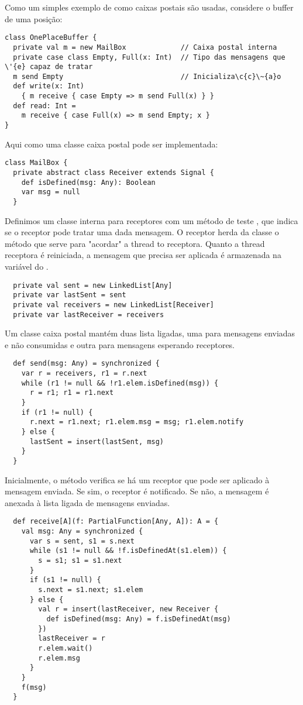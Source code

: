 Como um simples exemplo de como caixas postais são usadas, considere o buffer de uma posição:
\begin{lstlisting}
class OnePlaceBuffer {
  private val m = new MailBox             // Caixa postal interna
  private case class Empty, Full(x: Int)  // Tipo das mensagens que \'{e} capaz de tratar
  m send Empty                            // Inicializa\c{c}\~{a}o
  def write(x: Int)
    { m receive { case Empty => m send Full(x) } }
  def read: Int =
    m receive { case Full(x) => m send Empty; x }
}
\end{lstlisting}
Aqui como uma classe caixa postal pode ser implementada:
\begin{lstlisting}
class MailBox {
  private abstract class Receiver extends Signal {
    def isDefined(msg: Any): Boolean
    var msg = null
  }
\end{lstlisting}
Definimos um classe interna para receptores com um método de teste
, que indica se o receptor pode tratar uma dada mensagem. 
O receptor herda da classe  o método  que serve 
para "acordar" a thread to receptora. Quanto a thread receptora é reiniciada, 
a mensagem que precisa ser aplicada é armazenada na variável  
do .
\begin{lstlisting}
  private val sent = new LinkedList[Any]
  private var lastSent = sent
  private val receivers = new LinkedList[Receiver]
  private var lastReceiver = receivers
\end{lstlisting}
Um classe caixa postal mantém duas lista ligadas,
uma para mensagens enviadas e não consumidas e outra
para mensagens esperando receptores.
\begin{lstlisting}
  def send(msg: Any) = synchronized {
    var r = receivers, r1 = r.next
    while (r1 != null && !r1.elem.isDefined(msg)) {
      r = r1; r1 = r1.next
    }
    if (r1 != null) {
      r.next = r1.next; r1.elem.msg = msg; r1.elem.notify
    } else {
      lastSent = insert(lastSent, msg)
    }
  }
\end{lstlisting}
Inicialmente, o método  verifica se há um receptor que
pode ser aplicado à mensagem enviada. Se sim, o receptor é notificado.
Se não, a mensagem é anexada à lista ligada de mensagens enviadas.
\begin{lstlisting}
  def receive[A](f: PartialFunction[Any, A]): A = {
    val msg: Any = synchronized {
      var s = sent, s1 = s.next
      while (s1 != null && !f.isDefinedAt(s1.elem)) {
        s = s1; s1 = s1.next
      }
      if (s1 != null) {
        s.next = s1.next; s1.elem
      } else {
        val r = insert(lastReceiver, new Receiver {
          def isDefined(msg: Any) = f.isDefinedAt(msg)
        })
        lastReceiver = r
        r.elem.wait()
        r.elem.msg
      }
    }
    f(msg)
  }
\end{lstlisting}
